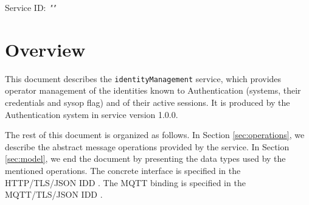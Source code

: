 \documentclass[a4paper]{arrowhead}
\begin{document}
\sloppy

\ArrowheadSetup

\begin{center}
  \vspace*{1cm}
  \huge{\arrowtitle}

  \vspace*{0.2cm}
  \LARGE{\arrowtype}
  \vspace*{1cm}

  \Large{Service ID: \textit{"\arrowid"}}

  \vspace*{\fill}


  \vspace*{1cm}
  \vspace*{\fill}

  \begin{abstract}
    This document describes the \texttt{identityManagement} service, version 1.0.0, produced by the Authentication core system of Arrowhead 5.2.2.
  \end{abstract}

  \vspace*{1cm}
\end{center}

\newpage

\tableofcontents
\newpage

\section{Overview}
\label{sec:overview}

This document describes the \texttt{identityManagement} service, which provides operator management of the identities known to Authentication (systems, their credentials and sysop flag) and of their active sessions.
It is produced by the Authentication system \cite{auth-sysd} in service version 1.0.0.

The rest of this document is organized as follows.
In Section \ref{sec:operations}, we describe the abstract message operations provided by the service.
In Section \ref{sec:model}, we end the document by presenting the data types used by the mentioned operations.
The concrete interface is specified in the HTTP/TLS/JSON IDD \cite{auth-identityManagement-http-idd}. The MQTT binding is specified in the MQTT/TLS/JSON IDD \cite{auth-identityManagement-mqtt-idd}.
\end{document}
